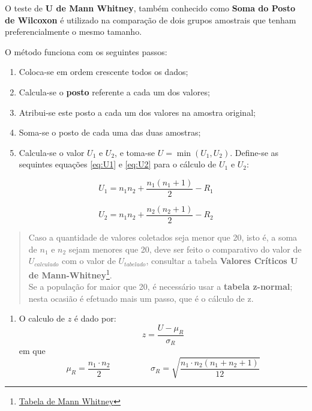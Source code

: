 \documentclass[
]{book}
\providecommand{\tightlist}{%
  \setlength{\itemsep}{0pt}\setlength{\parskip}{0pt}}
\begin{document}
O teste de \textbf{U de Mann Whitney}, também conhecido como \textbf{Soma do Posto de Wilcoxon} é utilizado na comparação de dois grupos amostrais que tenham preferencialmente o mesmo tamanho.

O método funciona com os seguintes passos:

\begin{enumerate}
\def\labelenumi{\arabic{enumi}.}
\tightlist
\item
  Coloca-se em ordem crescente todos os dados;
\item
  Calcula-se o \textbf{posto} referente a cada um dos valores;
\item
  Atribui-se este posto a cada um dos valores na amostra original;
\item
  Soma-se o posto de cada uma das duas amostras;
\item
  Calcula-se o valor \(U_1\) e \(U_2\), e toma-se \(U = \min(U_1,U_2)\). Define-se as sequintes equações \eqref{eq:U1} e \eqref{eq:U2} para o cálculo de \(U_1\) e \(U_2\):
\end{enumerate}

\begin{equation}
  U_1 = n_1 n_2 + \frac{n_1(n_1+1)}{2} - R_1 
  \label{eq:U1}
\end{equation}

\begin{equation}
U_2 = n_1 n_2 + \frac{n_2(n_2+1)}{2} - R_2
\label{eq:U2}
\end{equation}

\begin{quote}
Caso a quantidade de valores coletados seja menor que 20, isto é, a soma de \(n_1\) e \(n_2\) sejam menores que 20, deve ser feito o comparativo do valor de \(U_{calculado}\) com o valor de \(U_{tabelado}\), consultar a tabela \textbf{Valores Críticos U de Mann-Whitney}\footnote{\href{https://ocw.umb.edu/psychology/psych-270/other-materials/RelativeResourceManager.pdf}{Tabela de Mann Whitney}}.\\
Se a população for maior que 20, é necessário usar a \textbf{tabela z-normal}; nesta ocasião é efetuado mais um passo, que é o cálculo de z.
\end{quote}

\begin{enumerate}
\def\labelenumi{\arabic{enumi}.}
\setcounter{enumi}{5}
\tightlist
\item
  O calculo de \(z\) é dado por:
  \begin{equation}
  z = \frac{U - \mu_R}{\sigma_R}
  \label{eq:zMannWhitney}
  \end{equation}
  em que
  \[ 
  \mu_R = \frac{n_1 \cdot n_2}{2} \hspace{2cm} \sigma_R = \sqrt{\frac{n_1 \cdot n_2(n_1 + n_2 + 1)}{12}}
  \]
\end{enumerate}
\end{document}
